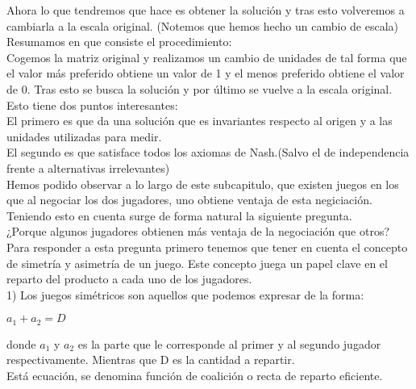 \documentclass[10pt,a4paper]{book}
\begin{document}
Ahora lo que tendremos que hace es obtener la solución y tras esto volveremos a cambiarla a la escala original. (Notemos que hemos hecho un cambio de escala)\\

Resumamos en que consiste el procedimiento:\\
Cogemos la matriz original y realizamos un cambio de unidades de tal forma que el valor más preferido obtiene un valor de 1 y el menos preferido obtiene el valor de 0. Tras esto se busca la solución y por último se vuelve a la escala original.\\

Esto tiene dos puntos interesantes:\\
El primero es que da una solución que es invariantes respecto al origen y a las unidades utilizadas para medir.\\
El segundo es que satisface todos los axiomas de Nash.(Salvo el de independencia frente a alternativas irrelevantes)\\


Hemos podido observar a lo largo de este subcapitulo, que existen juegos en los que al negociar los dos jugadores, uno obtiene ventaja de esta negiciación. Teniendo esto en cuenta surge de forma natural la siguiente pregunta.\\

¿Porque algunos jugadores obtienen más ventaja de la negociación que otros?\\

Para responder a esta pregunta primero tenemos que tener en cuenta el concepto de simetría y asimetría de un juego. Este concepto juega un papel clave en el reparto del producto a cada uno de los jugadores.\\

1) Los juegos simétricos son aquellos que podemos expresar de la forma:\\

\begin{center}

$a_1 + a_2=D$

\end{center}

donde $a_1$ y $a_2$ es la parte que le corresponde al primer y al segundo jugador respectivamente. Mientras que D es la cantidad a repartir.\\

Está ecuación, se denomina función de coalición o recta de reparto eficiente.\\
\end{document}
